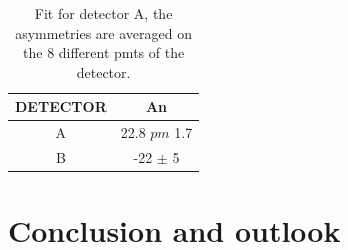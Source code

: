 \begin{table}
\centering
\begin{tabular}{c|c}
\hline
 DETECTOR   & An    \\
\hline
 A          & 22.8 $pm$ 1.7  \\
 B          & -22 $\pm$ 5   \\
\hline
\end{tabular}
\caption{Fit for detector A, the asymmetries are averaged on the 8 different pmts of the detector.}
\end{table}

\chapter{Conclusion and outlook} \label{conclusion}

